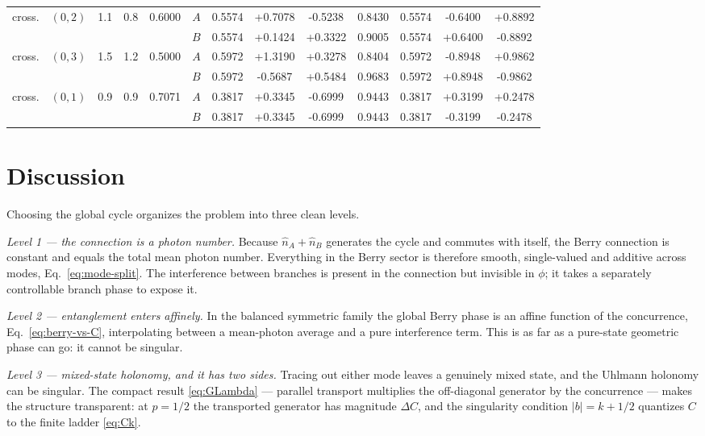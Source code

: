 \documentclass[11pt]{article}
\newcommand{\nop}{\hat n}
\begin{document}
\begin{table}[htbp]
\begin{tabular}{llccccccccccc}
\midrule
cross. & $(0,2)$ & 1.1 & 0.8 & 0.6000 & $A$ & 0.5574 & +0.7078 & -0.5238 & 0.8430 & 0.5574 & -0.6400 & +0.8892\\
 &  &  &  &  & $B$ & 0.5574 & +0.1424 & +0.3322 & 0.9005 & 0.5574 & +0.6400 & -0.8892\\
\midrule
cross. & $(0,3)$ & 1.5 & 1.2 & 0.5000 & $A$ & 0.5972 & +1.3190 & +0.3278 & 0.8404 & 0.5972 & -0.8948 & +0.9862\\
 &  &  &  &  & $B$ & 0.5972 & -0.5687 & +0.5484 & 0.9683 & 0.5972 & +0.8948 & -0.9862\\
\midrule
cross. & $(0,1)$ & 0.9 & 0.9 & 0.7071 & $A$ & 0.3817 & +0.3345 & -0.6999 & 0.9443 & 0.3817 & +0.3199 & +0.2478\\
 &  &  &  &  & $B$ & 0.3817 & +0.3345 & -0.6999 & 0.9443 & 0.3817 & -0.3199 & -0.2478\\
\bottomrule
\end{tabular}
\end{table}

\section{Discussion}

Choosing the global cycle organizes the problem into three clean levels.

\emph{Level 1 --- the connection is a photon number.} Because
$\nop_A+\nop_B$ generates the cycle and commutes with itself, the Berry
connection is constant and equals the total mean photon number. Everything in
the Berry sector is therefore smooth, single-valued and additive across modes,
Eq.~\eqref{eq:mode-split}. The interference between branches is present in the
connection but invisible in $\phi$; it takes a separately controllable branch
phase to expose it.

\emph{Level 2 --- entanglement enters affinely.} In the balanced symmetric
family the global Berry phase is an affine function of the concurrence,
Eq.~\eqref{eq:berry-vs-C}, interpolating between a mean-photon average and a
pure interference term. This is as far as a pure-state geometric phase can go:
it cannot be singular.

\emph{Level 3 --- mixed-state holonomy, and it has two sides.} Tracing out
either mode leaves a genuinely mixed state, and the Uhlmann holonomy can be
singular. The compact result \eqref{eq:GLambda} --- parallel transport
multiplies the off-diagonal generator by the concurrence --- makes the
structure transparent: at $p=1/2$ the transported generator has magnitude
$\Delta C$, and the singularity condition $|b|=k+1/2$ quantizes $C$ to the
finite ladder \eqref{eq:Ck}.
\end{document}
